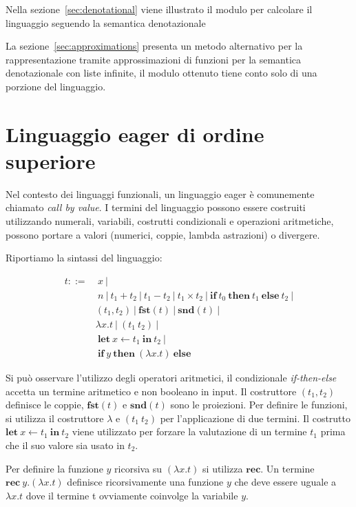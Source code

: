 \documentclass{article}
\newcommand{\rec}[2]{\mathbf{rec}\ #1 . ( #2 )}
\newcommand{\letin}[2]{\mathbf{let}\ #1\ \mathbf{in}\ #2}
\newcommand{\ite}[3]{\mathbf{if}\ #1\ \mathbf{then}\ #2\ \mathbf{else}\ #3}
\newcommand{\fst}[1]{\mathbf{fst} (#1)}
\newcommand{\snd}[1]{\mathbf{snd} (#1)}
\newcommand{\lamb}[2]{\lambda #1 . #2}
\begin{document}
Nella sezione~\ref{sec:denotational} viene illustrato il modulo per calcolare il linguaggio seguendo la semantica denotazionale

La sezione~\ref{sec:approximations} presenta un metodo alternativo per la rappresentazione tramite approssimazioni di funzioni per la semantica denotazionale con liste infinite, il modulo ottenuto tiene conto solo di una porzione del linguaggio.


\section{Linguaggio eager di ordine superiore}
\label{sec:language}
Nel contesto dei linguaggi funzionali, un linguaggio eager è comunemente chiamato \emph{call by value}. 
I termini del linguaggio possono essere costruiti utilizzando numerali, variabili, costrutti condizionali e operazioni aritmetiche, possono portare a valori (numerici, coppie, lambda astrazioni) o divergere.

Riportiamo la sintassi del linguaggio:

\begin{equation*}
\begin{split}
t ::=& \ x \ \big| \\
& \ n \ \big| \ t_{1} + t_{2} \ \big| \ t_{1} - t_{2} \ \big| \ t_{1} \times t_{2} \ \big| \ \ite{t_{0}}{t_{1}}{t_{2}} \ \big| \\
& (t_{1}, t_{2}) \ \big| \ \fst{t} \ \big| \ \snd{t}\ \big| \\
& \lamb{x}{t} \ \big| \ (t_{1}\ t_{2}) \ \big| \\
& \ \letin{x \leftarrow t_{1}}{t_{2}} \ \big| \\
& \ \ite {y}{(\lambda x . t)} 
\end{split}
\end{equation*}

Si può osservare l'utilizzo degli operatori aritmetici, il condizionale \emph{if-then-else} accetta un termine aritmetico e non booleano in input.
Il costruttore $(t_{1}, t_{2})$ definisce le coppie, $\fst{t}$ e $\snd{t}$ sono le proiezioni.
Per definire le funzioni, si utilizza il costruttore $\lambda$ e $(t_{1}\ t_{2})$ per l'applicazione di due termini.
Il costrutto $\letin{x \leftarrow t_{1}}{t_{2}}$ viene utilizzato per forzare la valutazione di un termine $t_1$ prima che il suo valore sia usato in $t_2$.

Per definire la funzione $y$ ricorsiva su $(\lambda x . t)$ si utilizza $\textbf{rec}$.
Un termine $\rec{y}{\lamb{x}{t}}$ definisce ricorsivamente una funzione $y$ che deve essere uguale a $\lamb{x}{t}$ dove il termine t ovviamente coinvolge la variabile $y$.
\end{document}
